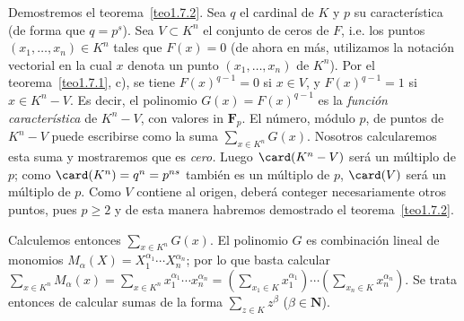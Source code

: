 \documentclass[bibtotoc,leqno,spanish]{amsbook}
\newcommand{\NN}{\mathbf{N}}
\newcommand{\FF}{\mathbf{F}}
\numberwithin{equation}{section}
\theoremstyle{note}
\theoremstyle{note}
\theoremstyle{rem}
\numberwithin{theorem}{section}
\numberwithin{proposition}{section}
\numberwithin{definition}{section}
\numberwithin{lemma}{section}
\numberwithin{corollary}{section}
\numberwithin{example}{section}
\numberwithin{footnote}{section}%
\begin{document}
Demostremos el teorema~\ref{teo1.7.2}. Sea $q$ el cardinal de $K$ y $p$ su caracter\'istica (de forma que
$q = p^{s}$). Sea $V\subset K^{n}$ el conjunto de ceros de $F$, i.e. los puntos $(x_{1},\dots,x_{n})\in K^{n}$
tales que $F(x) = 0$ (de ahora en m\'as, utilizamos la notaci\'on vectorial en la cual $x$ denota
un punto $(x_{1},\dots,x_{n})$ de $K^{n}$). Por el teorema~\ref{teo1.7.1}, c),
se tiene $F(x)^{q-1} = 0$ si $x\in V$,
y $F(x)^{q-1} = 1$ si $x\in K^{n}-V$. Es decir, el polinomio $G(x) = F(x)^{q-1}$ es la
{\em funci\'on caracter\'istica} de $K^{n}-V$, con valores in $\FF_{p}$. El n\'umero, m\'odulo $p$,
de puntos de $K^{n}-V$ puede escribirse como la suma $\sum_{x\in K^{n}}G(x)$. Nosotros calcularemos esta
suma y mostraremos que es {\em cero.} Luego $\card(K^{n}-V)$ ser\'a un m\'ultiplo de $p$; como $\card(K^{n})
=q^{n}=p^{ns}$ tambi\'en es un m\'ultiplo de $p$, $\card(V)$ ser\'a un m\'ultiplo de $p$. Como $V$ contiene
al origen, deber\'a conteger necesariamente otros puntos, pues $p\geq 2$ y de esta manera habremos demostrado
el teorema~\ref{teo1.7.2}.

Calculemos entonces $\sum_{x\in K^{n}}G(x)$. El polinomio $G$ es combinaci\'on lineal de monomios
$M_{\alpha}(X) = X_{1}^{\alpha_{1}}\cdots X_{n}^{\alpha_{n}}$; por lo que basta calcular
$\sum_{x\in K^{n}}M_{\alpha}(x) = \sum_{x\in K^{n}}x_{1}^{\alpha_{1}}\cdots x_{n}^{\alpha_{n}}
= \left(\sum_{x_{1}\in K}x_{1}^{\alpha_{1}}\right)\cdots\left(\sum_{x_{n}\in K}x_{n}^{\alpha_{n}}\right)$.
Se trata entonces de calcular sumas de la forma $\sum_{z\in K}z^{\beta}$ ($\beta\in\NN$).
\end{document}
